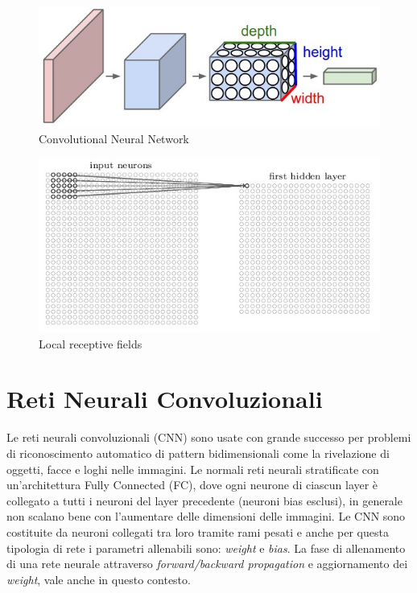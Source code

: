 \documentclass[twoside,twocolumn,10pt]{extarticle}
\theoremstyle{definition}
\begin{document}
\begin{figure}[h]
	\centering
	\includegraphics[scale=.6]{images/cnn.jpeg}
	\caption{Convolutional Neural Network}
	\label{fig:cnn}
\end{figure}

\begin{figure}[h]
	\centering
	\includegraphics[scale=.8]{images/hlayer.jpeg}
	\caption{Local receptive fields}
	\label{fig:hlayer}
\end{figure}

\section{Reti Neurali Convoluzionali}\label{sec:cnn}
Le reti neurali convoluzionali (CNN) sono usate con grande successo per problemi di riconoscimento automatico di pattern bidimensionali come la rivelazione di oggetti, facce e loghi nelle immagini. Le normali reti neurali stratificate con un'architettura Fully Connected (FC), dove ogni neurone di ciascun layer è collegato a tutti i neuroni del layer precedente (neuroni bias esclusi), in generale non scalano bene con l'aumentare delle dimensioni delle immagini. Le CNN sono costituite da neuroni collegati tra loro tramite rami pesati e anche per questa tipologia di rete i parametri allenabili sono: \textit{weight} e \textit{bias}. La fase di allenamento di una rete neurale attraverso \textit{forward/backward propagation} e aggiornamento dei \textit{weight}, vale anche in questo contesto. 
\end{document}
